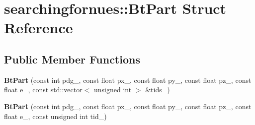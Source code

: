 \hypertarget{structsearchingfornues_1_1BtPart}{}\section{searchingfornues\+:\+:Bt\+Part Struct Reference}
\label{structsearchingfornues_1_1BtPart}
\subsection*{Public Member Functions}
\begin{DoxyCompactItemize}
\item 
{\bfseries Bt\+Part} (const int pdg\+\_\+, const float px\+\_\+, const float py\+\_\+, const float pz\+\_\+, const float e\+\_\+, const std\+::vector$<$ unsigned int $>$ \&tids\+\_\+)\hypertarget{structsearchingfornues_1_1BtPart_a00003f0908892d8a64f80a8b3f2e6f90}{}\label{structsearchingfornues_1_1BtPart_a00003f0908892d8a64f80a8b3f2e6f90}

\item 
{\bfseries Bt\+Part} (const int pdg\+\_\+, const float px\+\_\+, const float py\+\_\+, const float pz\+\_\+, const float e\+\_\+, const unsigned int tid\+\_\+)\hypertarget{structsearchingfornues_1_1BtPart_a69048423846c19666791da82138ce613}{}\label{structsearchingfornues_1_1BtPart_a69048423846c19666791da82138ce613}

\end{DoxyCompactItemize}
